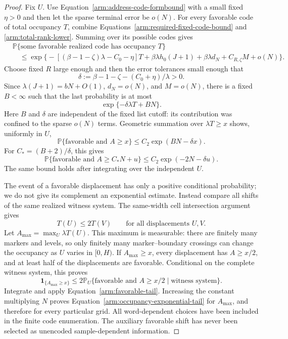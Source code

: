 \begin{proof}
Fix $U$.  Use Equation~\eqref{arm:address-code-formbound} with a small
fixed $\eta>0$ and then let the sparse terminal error be $o(N)$.
For every favorable code of total occupancy $T$, combine
Equations~\eqref{arm:required-fixed-code-bound} and
\eqref{arm:total-rank-lower}.  Summing over its possible codes gives
\begin{align*}
 &\mathbb P\{\text{some favorable realized code has occupancy }T\}\\
 &\quad\leq
 \exp\bigl\{
 -[(\beta-1-\zeta)\lambda-C_0-\eta]T
 +\beta\lambda h_0(J+1)
 +\beta\lambda d_N+C_{R,\zeta}M+o(N)
 \bigr\}.
\end{align*}
Choose fixed $R$ large enough and then the error tolerances small enough
that
\[
 \delta:=\beta-1-\zeta-(C_0+\eta)/\lambda>0.
\]
Since $\lambda(J+1)=bN+O(1)$, $d_N=o(N)$, and $M=o(N)$, there is a fixed
$B<\infty$ such that the last probability is at most
\begin{equation}\label{arm:fixed-occupancy-union}
 \exp\{-\delta\lambda T+BN\}.
\end{equation}
Here $B$ and $\delta$ are independent of the fixed list cutoff: its
contribution was confined to the sparse $o(N)$ terms.  Geometric summation
over $\lambda T\geq x$ shows, uniformly in $U$,
\[
 \mathbb P\{\text{favorable and }A\geq x\}
 \leq C_2\exp(BN-\delta x).
\]
For $C_*=(B+2)/\delta$, this gives
\begin{equation}\label{arm:favorable-tail}
 \mathbb P\{\text{favorable and }A\geq C_*N+u\}
 \leq C_2\exp(-2N-\delta u).
\end{equation}
The same bound holds after integrating over the independent $U$.

The event of a favorable displacement has only a positive conditional
probability; we do not give its complement an exponential estimate.
Instead compare all shifts of the same realized witness system.  The
same-width cell intersection argument gives
\[
 T(U)\leq2T(V)\qquad\text{for all displacements }U,V.
\]
Let $A_{\max}=\max_U\lambda T(U)$.  This maximum is measurable:
there are finitely many markers and levels, so only finitely many
marker--boundary crossings can change the occupancy as $U$ varies in
$[0,H)$.  If $A_{\max}\geq x$, every displacement has $A\geq x/2$,
and at least half of the displacements are favorable.  Conditional on
the complete witness system, this proves
\[
 \mathbf 1_{\{A_{\max}\geq x\}}
 \leq2\mathbb P_U\{\text{favorable and }A\geq x/2
                      \mid\text{witness system}\}.
\]
Integrate and apply Equation~\eqref{arm:favorable-tail}.  Increasing
the constant multiplying $N$ proves
Equation~\eqref{arm:occupancy-exponential-tail} for $A_{\max}$, and
therefore for every particular grid.  All word-dependent choices have
been included in the finite code enumeration.  The auxiliary favorable
shift has never been selected as unencoded sample-dependent information.


\end{proof}
